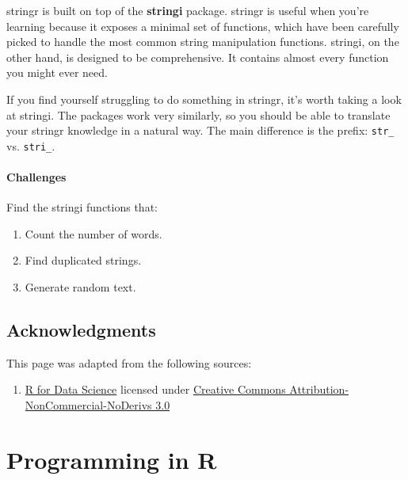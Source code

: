 \documentclass[]{book}
\providecommand{\tightlist}{%
  \setlength{\itemsep}{0pt}\setlength{\parskip}{0pt}}
\begin{document}
stringr is built on top of the \textbf{stringi} package. stringr is useful when you're learning because it exposes a minimal set of functions, which have been carefully picked to handle the most common string manipulation functions. stringi, on the other hand, is designed to be comprehensive. It contains almost every function you might ever need.

If you find yourself struggling to do something in stringr, it's worth taking a look at stringi. The packages work very similarly, so you should be able to translate your stringr knowledge in a natural way. The main difference is the prefix: \texttt{str\_} vs. \texttt{stri\_}.

\hypertarget{challenges-20}{%
\subsubsection*{Challenges}\label{challenges-20}}

Find the stringi functions that:

\begin{enumerate}
\def\labelenumi{\arabic{enumi}.}
\item
  Count the number of words.
\item
  Find duplicated strings.
\item
  Generate random text.
\end{enumerate}

\hypertarget{acknowledgments-5}{%
\section*{Acknowledgments}\label{acknowledgments-5}}

This page was adapted from the following sources:

\begin{enumerate}
\def\labelenumi{\arabic{enumi}.}
\tightlist
\item
  \href{https://r4ds.had.co.nz}{R for Data Science} licensed under \href{https://creativecommons.org/licenses/by-nc-nd/3.0/us/}{Creative Commons Attribution-NonCommercial-NoDerivs 3.0}
\end{enumerate}

\hypertarget{programming-in-r}{%
\chapter{Programming in R}\label{programming-in-r}}
\end{document}
